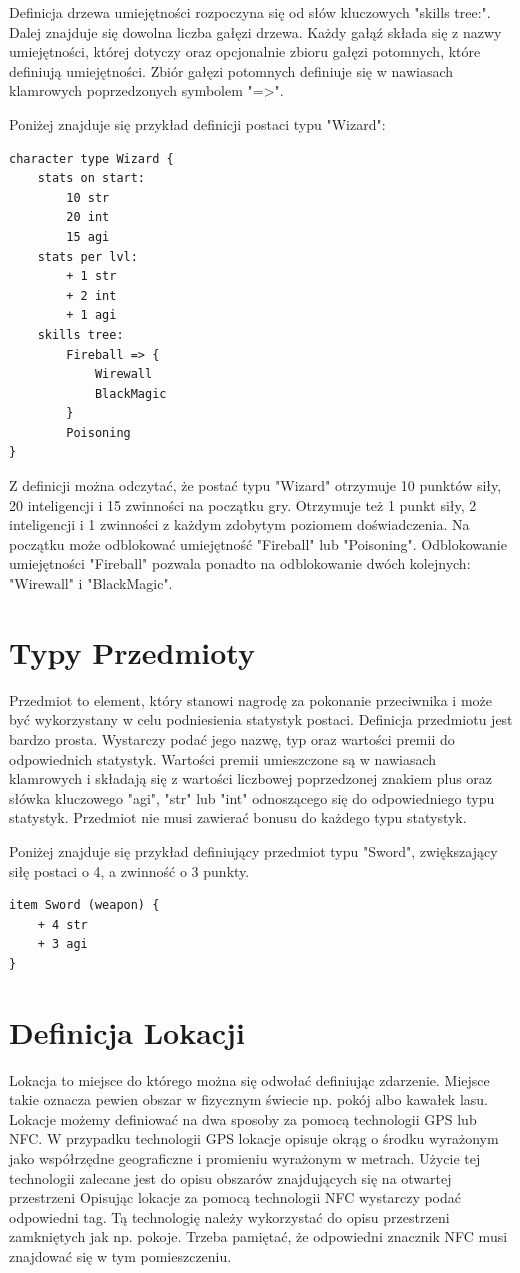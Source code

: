 \documentclass	{xmgr}
\begin{document}
Definicja drzewa umiejętności rozpoczyna się od słów kluczowych "skills tree:". Dalej znajduje się dowolna liczba gałęzi drzewa.
Każdy gałąź składa się z nazwy umiejętności, której dotyczy oraz opcjonalnie zbioru gałęzi potomnych, które definiują umiejętności.
Zbiór gałęzi potomnych definiuje się w nawiasach klamrowych poprzedzonych symbolem "=>". 

Poniżej znajduje się przykład definicji postaci typu "Wizard":
\begin{lstlisting}
character type Wizard {
	stats on start:
		10 str
		20 int
		15 agi
	stats per lvl:
		+ 1 str
		+ 2 int
		+ 1 agi
	skills tree:
		Fireball => {
			Wirewall
			BlackMagic
		}
		Poisoning
}
\end{lstlisting}
Z definicji można odczytać, że postać typu "Wizard" otrzymuje 10 punktów siły, 20 inteligencji i 15 zwinności na początku gry.
Otrzymuje też 1 punkt siły, 2 inteligencji i 1 zwinności z każdym zdobytym poziomem doświadczenia.
Na początku może odblokować umiejętność "Fireball" lub "Poisoning". Odblokowanie umiejętności "Fireball" pozwala ponadto na odblokowanie dwóch kolejnych: "Wirewall" i "BlackMagic". 

\section{Typy Przedmioty}
Przedmiot to element, który stanowi nagrodę za pokonanie przeciwnika i może być wykorzystany w celu podniesienia statystyk postaci. 
Definicja przedmiotu jest bardzo prosta. Wystarczy podać jego nazwę, typ oraz wartości premii do odpowiednich statystyk.
Wartości premii umieszczone są w nawiasach klamrowych i składają się z wartości liczbowej poprzedzonej znakiem plus oraz słówka kluczowego "agi", "str" lub "int" odnoszącego się do odpowiedniego typu statystyk. Przedmiot nie musi zawierać bonusu do każdego typu statystyk.

Poniżej znajduje się przykład definiujący przedmiot typu "Sword", zwiększający siłę postaci o 4, a zwinność o 3 punkty.
\begin{lstlisting}
item Sword (weapon) {
	+ 4 str
	+ 3 agi
}
\end{lstlisting}

\section{Definicja Lokacji}
Lokacja to miejsce do którego można się odwołać definiując zdarzenie. Miejsce takie oznacza pewien obszar w fizycznym świecie np. pokój albo kawałek lasu. Lokacje możemy definiować na dwa sposoby za pomocą technologii GPS lub NFC. 
W przypadku technologii GPS lokacje opisuje okrąg o środku wyrażonym jako współrzędne geograficzne i promieniu wyrażonym w metrach. Użycie tej technologii zalecane jest do opisu obszarów znajdujących się na otwartej przestrzeni 
Opisując lokacje za pomocą technologii NFC wystarczy podać odpowiedni tag. Tą technologię należy wykorzystać do opisu przestrzeni zamkniętych jak np. pokoje. Trzeba pamiętać, że odpowiedni znacznik NFC musi znajdować się w tym pomieszczeniu.
\end{document}
